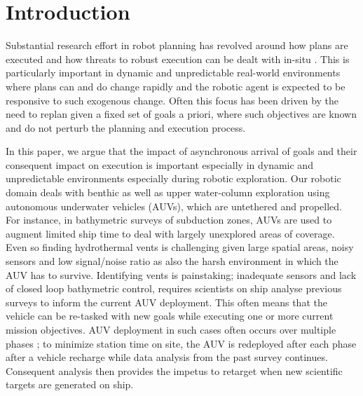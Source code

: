 \section{Introduction}
\label{sec:intro}

Substantial research effort in robot planning has revolved around how
plans are executed and how threats to robust execution can be dealt
with in-situ . This is particularly
important in dynamic and unpredictable real-world environments where
plans can and do change rapidly and the robotic agent is expected to
be responsive to such exogenous change. Often this focus has been
driven by the need to replan given a fixed set of goals a priori,
where such objectives are known and do not perturb the planning and
execution process.

In this paper, we argue that the impact of asynchronous arrival of
goals and their consequent impact on execution is important especially
in dynamic and unpredictable environments especially during robotic
exploration. Our robotic domain deals with benthic as well as upper
water-column exploration using autonomous underwater vehicles (AUVs),
which are untethered and propelled. For instance, in bathymetric
surveys of subduction zones, AUVs are used to augment limited ship
time to deal with largely unexplored areas of coverage. Even so
finding hydrothermal vents is challenging given large spatial areas,
noisy sensors and low signal/noise ratio as also the harsh environment
in which the AUV has to survive. Identifying vents is painstaking;
inadequate sensors and lack of closed loop bathymetric control,
requires scientists on ship analyse previous surveys to inform the
current AUV deployment. This often means that the vehicle can be
re-tasked with new goals while executing one or more current mission
objectives.  AUV deployment in such cases often occurs over multiple
phases \cite{Yoerger01012007}; to minimize station time on site, the
AUV is redeployed after each phase after a vehicle recharge while data
analysis from the past survey continues. Consequent analysis then
provides the impetus to retarget when new scientific targets are
generated on ship.


